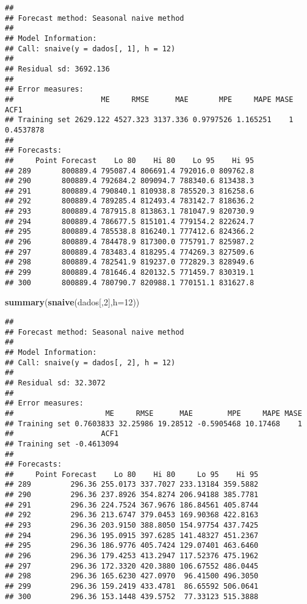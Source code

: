 \documentclass[]{article}
\newenvironment{Shaded}{\begin{snugshade}}{\end{snugshade}}
\newcommand{\DataTypeTok}[1]{\textcolor[rgb]{0.13,0.29,0.53}{#1}}
\newcommand{\DecValTok}[1]{\textcolor[rgb]{0.00,0.00,0.81}{#1}}
\newcommand{\KeywordTok}[1]{\textcolor[rgb]{0.13,0.29,0.53}{\textbf{#1}}}
\newcommand{\NormalTok}[1]{#1}
\begin{document}
\begin{verbatim}
## 
## Forecast method: Seasonal naive method
## 
## Model Information:
## Call: snaive(y = dados[, 1], h = 12) 
## 
## Residual sd: 3692.136 
## 
## Error measures:
##                    ME     RMSE      MAE       MPE     MAPE MASE      ACF1
## Training set 2629.122 4527.323 3137.336 0.9797526 1.165251    1 0.4537878
## 
## Forecasts:
##     Point Forecast    Lo 80    Hi 80    Lo 95    Hi 95
## 289       800889.4 795087.4 806691.4 792016.0 809762.8
## 290       800889.4 792684.2 809094.7 788340.6 813438.3
## 291       800889.4 790840.1 810938.8 785520.3 816258.6
## 292       800889.4 789285.4 812493.4 783142.7 818636.2
## 293       800889.4 787915.8 813863.1 781047.9 820730.9
## 294       800889.4 786677.5 815101.4 779154.2 822624.7
## 295       800889.4 785538.8 816240.1 777412.6 824366.2
## 296       800889.4 784478.9 817300.0 775791.7 825987.2
## 297       800889.4 783483.4 818295.4 774269.3 827509.6
## 298       800889.4 782541.9 819237.0 772829.3 828949.6
## 299       800889.4 781646.4 820132.5 771459.7 830319.1
## 300       800889.4 780790.7 820988.1 770151.1 831627.8
\end{verbatim}

\begin{Shaded}
\begin{Highlighting}[]
\KeywordTok{summary}\NormalTok{(}\KeywordTok{snaive}\NormalTok{(dados[,}\DecValTok{2}\NormalTok{],}\DataTypeTok{h=}\DecValTok{12}\NormalTok{))}
\end{Highlighting}
\end{Shaded}

\begin{verbatim}
## 
## Forecast method: Seasonal naive method
## 
## Model Information:
## Call: snaive(y = dados[, 2], h = 12) 
## 
## Residual sd: 32.3072 
## 
## Error measures:
##                     ME     RMSE      MAE        MPE     MAPE MASE
## Training set 0.7603833 32.25986 19.28512 -0.5905468 10.17468    1
##                    ACF1
## Training set -0.4613094
## 
## Forecasts:
##     Point Forecast    Lo 80    Hi 80     Lo 95    Hi 95
## 289         296.36 255.0173 337.7027 233.13184 359.5882
## 290         296.36 237.8926 354.8274 206.94188 385.7781
## 291         296.36 224.7524 367.9676 186.84561 405.8744
## 292         296.36 213.6747 379.0453 169.90368 422.8163
## 293         296.36 203.9150 388.8050 154.97754 437.7425
## 294         296.36 195.0915 397.6285 141.48327 451.2367
## 295         296.36 186.9776 405.7424 129.07401 463.6460
## 296         296.36 179.4253 413.2947 117.52376 475.1962
## 297         296.36 172.3320 420.3880 106.67552 486.0445
## 298         296.36 165.6230 427.0970  96.41500 496.3050
## 299         296.36 159.2419 433.4781  86.65592 506.0641
## 300         296.36 153.1448 439.5752  77.33123 515.3888
\end{verbatim}
\end{document}
